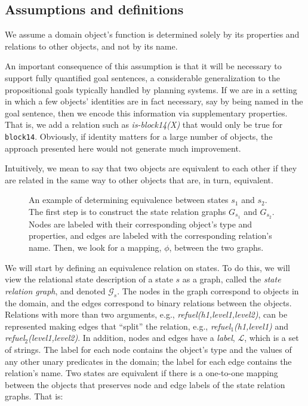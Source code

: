 \subsection{Assumptions  and definitions}

\begin{assumption}
  We assume a domain object's function is determined solely by its
properties and relations to other objects, and not by its
name.\label{identity_assumption}
\end{assumption}


  An important consequence of this assumption is that it will be necessary to support fully quantified goal sentences, a considerable generalization to the propositional goals typically handled by planning systems. If we are in a setting in
  which a few objects' identities are in fact necessary, say by being named in the goal sentence, then we
  encode this information via supplementary properties. That is, we add a
  relation such as {\em is-block14(X)} that would only be true for
  {\tt block14}.  Obviously, if identity matters for a large number of
  objects, the approach presented here would not generate much improvement.


Intuitively, we mean to say that two objects are equivalent to each
other if they are related in the same way to other objects that are,
in turn, equivalent.


\begin{figure*}
  \centerline{}
  \caption{An example of determining equivalence between states $s_1$ and $s_2$. The first step is to construct the state relation graphs $G_{s_1}$ and  $G_{s_2}$. Nodes are labeled with their corresponding object's type and properties, and edges are labeled with the corresponding relation's name. Then, we look for a mapping, $\phi$, between the two graphs.}
  \label{stateeg}
  \end{figure*}


We will start by defining an equivalence relation on states.  To do
this, we will view the relational state description of a state $s$ as
a graph, called the \emph{state relation graph}, and denoted
$\mathcal{G}_s$.  The nodes in the graph correspond to objects in the
domain, and the edges correspond to binary relations between the objects. 
Relations with more than two arguments, e.g., {\em refuel(h1,level1,level2)}, can be represented making edges that ``split'' the relation, e.g., {\em refuel$_1$(h1,level1)} and {\em refuel$_2$(level1,level2)}.
 In addition, nodes and edges have a
\emph{label}, $\mathcal{L}$, which is a set of
strings. The label for each node contains the
object's type and the values of any other unary predicates in the
domain; the label for each edge contains the relation's
name. Two states are equivalent if there is a one-to-one
mapping between the objects that preserves node and edge labels of the
state relation graphs.  That is:

